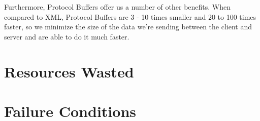 \documentclass[a4paper, 11pt]{article} %
\begin{document}
Furthermore, Protocol Buffers offer us a number of other benefits. When compared to XML, Protocol Buffers are 3 - 10 times smaller and 20 to 100 times faster, so we minimize the size of the data we're sending between the client and server and are able to do it much faster.

\section*{Resources Wasted}

\section*{Failure Conditions}




%
%




\end{document}
